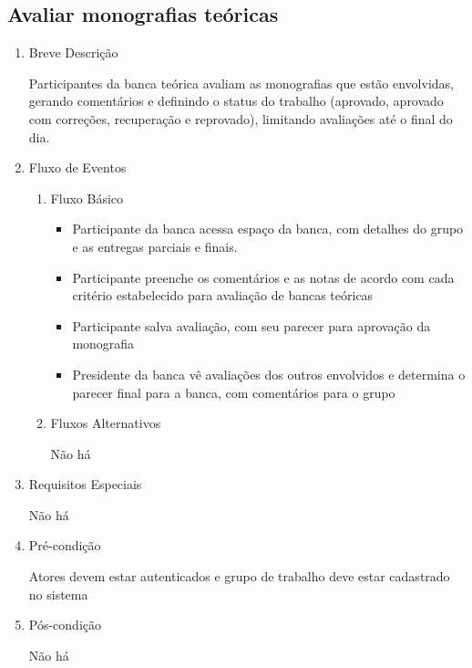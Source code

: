 \subsection{Avaliar monografias teóricas}


\begin{enumerate}
    \item Breve Descrição


Participantes da banca teórica avaliam as monografias que estão envolvidas, gerando comentários e definindo o status do trabalho (aprovado, aprovado com correções, recuperação e reprovado), limitando avaliações até o final do dia.


    \item Fluxo de Eventos

\begin{enumerate}
    \item Fluxo Básico

\begin{itemize}
    \item Participante da banca acessa espaço da banca, com detalhes do grupo e as entregas parciais e finais.

    \item Participante preenche os comentários e as notas de acordo com cada critério estabelecido para avaliação de bancas teóricas

    \item Participante salva avaliação, com seu parecer para aprovação da monografia

    \item Presidente da banca vê avaliações dos outros envolvidos e determina o parecer final para a banca, com comentários para o grupo
\end{itemize}

    \item Fluxos Alternativos

Não há



\end{enumerate}
    \item Requisitos Especiais


Não há


    \item Pré-condição


Atores devem estar autenticados e grupo de trabalho deve estar cadastrado no sistema


    \item Pós-condição

    Não há
\end{enumerate}


